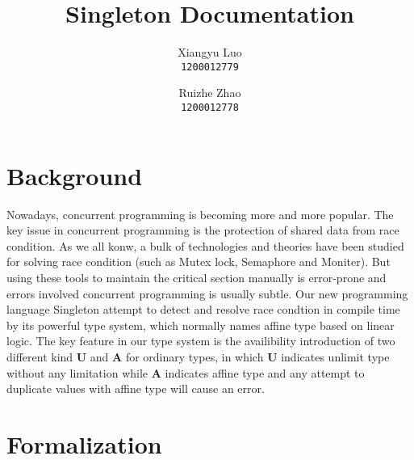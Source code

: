 \documentclass[10pt]{article}
\title{Singleton Documentation}
\author{Xiangyu Luo\\\texttt{1200012779} \and Ruizhe Zhao\\\texttt{1200012778}}
\theoremstyle{definition}\newtheorem*{theorem}{Theorem}
\theoremstyle{definition}\newtheorem*{definition}{Definition}
\theoremstyle{definition}\newtheorem*{lemma}{Lemma}
\begin{document}
	\maketitle
    \section{Background}
    Nowadays, concurrent programming is becoming more and more popular. The key issue in concurrent programming is the protection of shared data from race condition.
    As we all konw, a bulk of technologies and theories have been studied for solving race condition (such as Mutex lock, Semaphore and Moniter). But using these
    tools to maintain the critical section manually is error-prone and errors involved concurrent programming is usually subtle. Our new programming language Singleton
    attempt to detect and resolve race condtion in compile time by its powerful type system, which normally names affine type based on linear logic. The key feature in
    our type system is the availibility introduction of two different kind $\mathbf{U}$ and $\mathbf{A}$ for ordinary types, in which $\mathbf{U}$ indicates unlimit type without any
    limitation while $\mathbf{A}$ indicates affine type and any attempt to duplicate values with affine type will cause an error.

    \section{Formalization}
\end{document}
